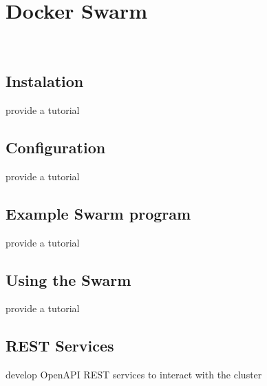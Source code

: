 \chapter{Docker Swarm}

\FILENAME\


\section{Instalation}

\begin{exercise}
provide a tutorial 
\end{exercise}

\section{Configuration}

\begin{exercise}
provide a tutorial 
\end{exercise}

\section{Example Swarm program}

\begin{exercise}
provide a tutorial 
\end{exercise}

\section{Using the Swarm}

\begin{exercise}
provide a tutorial 
\end{exercise}

\section{REST Services}

\begin{exercise}
develop OpenAPI REST services to interact with the cluster
\end{exercise}
